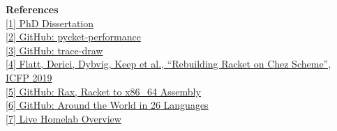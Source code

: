 {\small
	\noindent\textbf{References} \\[0.25em]
	\noindent \href{\dissertationurl}{[1] PhD Dissertation} \\
	\noindent \href{\pycketperfurl}{[2] GitHub: pycket-performance} \\
	\noindent \href{\tracedrawurl}{[3] GitHub: trace-draw} \\
	\noindent \href{\icfpreporturl}{[4] Flatt, Derici, Dybvig, Keep et al., ``Rebuilding Racket on Chez Scheme'', ICFP 2019} \\
	\noindent \href{\raxurl}{[5] GitHub: Rax, Racket to x86\_64 Assembly} \\
	\noindent \href{\atwurl}{[6] GitHub: Around the World in 26 Languages} \\
	\noindent \href{\homelaburl}{[7] Live Homelab Overview}
}



